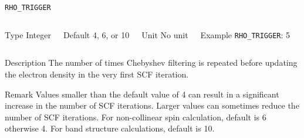 \begin{frame}[allowframebreaks]{\texttt{RHO\_TRIGGER}} \label{RHO_TRIGGER}
\vspace*{-12pt}
\begin{columns}
\begin{block}{Type}
Integer
\end{block}

\begin{block}{Default}
4, 6, or 10
\end{block}

\begin{block}{Unit}
No unit
\end{block}

\begin{block}{Example}
\texttt{RHO\_TRIGGER}: 5
\end{block}
\end{columns}

\begin{block}{Description}
The number of times Chebyshev filtering is repeated before updating the electron density in the very first SCF iteration.
\end{block}

\begin{block}{Remark}
Values smaller than the default value of 4 can result in a significant increase in the number of SCF
iterations. Larger values can sometimes reduce the number of SCF iterations. For non-collinear spin calculation, default is 6 otherwise 4. For band structure calculations, default is 10.
\end{block}

\end{frame}



